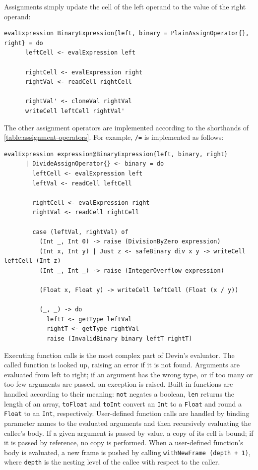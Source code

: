 \documentclass[UdineBachThesis,american,11pt]{PhdThesis}
\begin{document}
  Assignments simply update the cell of the left operand to the value of the
  right operand:

  \begin{Verbatim}[gobble=4,fontsize=\small]
    evalExpression BinaryExpression{left, binary = PlainAssignOperator{}, right} = do
      leftCell <- evalExpression left

      rightCell <- evalExpression right
      rightVal <- readCell rightCell

      rightVal' <- cloneVal rightVal
      writeCell leftCell rightVal'
  \end{Verbatim}

  The other assignment operators are implemented according to the shorthands of
  \autoref{table:assignment-operators}. For example, \mbox{\texttt{/=}} is
  implemented as follows:

  \begin{Verbatim}[gobble=4,fontsize=\small]
    evalExpression expression@BinaryExpression{left, binary, right}
      | DivideAssignOperator{} <- binary = do
        leftCell <- evalExpression left
        leftVal <- readCell leftCell

        rightCell <- evalExpression right
        rightVal <- readCell rightCell

        case (leftVal, rightVal) of
          (Int _, Int 0) -> raise (DivisionByZero expression)
          (Int x, Int y) | Just z <- safeBinary div x y -> writeCell leftCell (Int z)
          (Int _, Int _) -> raise (IntegerOverflow expression)

          (Float x, Float y) -> writeCell leftCell (Float (x / y))

          (_, _) -> do
            leftT <- getType leftVal
            rightT <- getType rightVal
            raise (InvalidBinary binary leftT rightT)
  \end{Verbatim}

  Executing function calls is the most complex part of Devin's evaluator. The
  called function is looked up, raising an error if it is not found. Arguments
  are evaluated from left to right; if an argument has the wrong type, or if too
  many or too few arguments are passed, an exception is raised. Built-in
  functions are handled according to their meaning: \mbox{\texttt{not}} negates
  a boolean, \mbox{\texttt{len}} returns the length of an array,
  \mbox{\texttt{toFloat}} and \mbox{\texttt{toInt}} convert an
  \mbox{\texttt{Int}} to a \mbox{\texttt{Float}} and round a
  \mbox{\texttt{Float}} to an \mbox{\texttt{Int}}, respectively. User-defined
  function calls are handled by binding parameter names to the evaluated
  arguments and then recursively evaluating the callee's body. If a given
  argument is passed by value, a copy of its cell is bound; if it is passed by
  reference, no copy is performed. When a user-defined function's body is
  evaluated, a new frame is pushed by calling
  \mbox{\texttt{withNewFrame (depth + 1)}}, where \mbox{\texttt{depth}} is the
  nesting level of the callee with respect to the caller.
\end{document}
